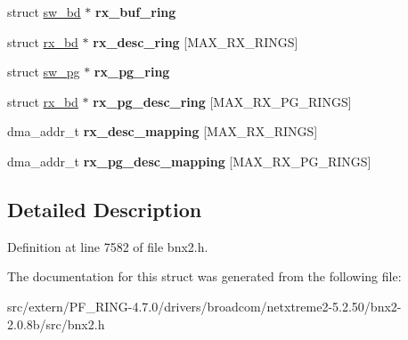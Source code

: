 \begin{DoxyCompactItemize}
\item 
\hypertarget{structbnx2__rx__ring__info_a7eef8a327b14adf7371ff3d52bf37116}{
struct \hyperlink{structsw__bd}{sw\_\-bd} $\ast$ {\bfseries rx\_\-buf\_\-ring}}
\label{structbnx2__rx__ring__info_a7eef8a327b14adf7371ff3d52bf37116}

\item 
\hypertarget{structbnx2__rx__ring__info_a41338d54fb234d07ecdc61f8ce20fc56}{
struct \hyperlink{structrx__bd}{rx\_\-bd} $\ast$ {\bfseries rx\_\-desc\_\-ring} \mbox{[}MAX\_\-RX\_\-RINGS\mbox{]}}
\label{structbnx2__rx__ring__info_a41338d54fb234d07ecdc61f8ce20fc56}

\item 
\hypertarget{structbnx2__rx__ring__info_a7b2e9eb4bd987b8bb52fb674bae6262d}{
struct \hyperlink{structsw__pg}{sw\_\-pg} $\ast$ {\bfseries rx\_\-pg\_\-ring}}
\label{structbnx2__rx__ring__info_a7b2e9eb4bd987b8bb52fb674bae6262d}

\item 
\hypertarget{structbnx2__rx__ring__info_a10c7ebc7021e44112f2642884e8a659f}{
struct \hyperlink{structrx__bd}{rx\_\-bd} $\ast$ {\bfseries rx\_\-pg\_\-desc\_\-ring} \mbox{[}MAX\_\-RX\_\-PG\_\-RINGS\mbox{]}}
\label{structbnx2__rx__ring__info_a10c7ebc7021e44112f2642884e8a659f}

\item 
\hypertarget{structbnx2__rx__ring__info_a7a166e4a8b81f1431d48d49fd57a9d4c}{
dma\_\-addr\_\-t {\bfseries rx\_\-desc\_\-mapping} \mbox{[}MAX\_\-RX\_\-RINGS\mbox{]}}
\label{structbnx2__rx__ring__info_a7a166e4a8b81f1431d48d49fd57a9d4c}

\item 
\hypertarget{structbnx2__rx__ring__info_abfe4905d4a02fd168b3e987799bb0948}{
dma\_\-addr\_\-t {\bfseries rx\_\-pg\_\-desc\_\-mapping} \mbox{[}MAX\_\-RX\_\-PG\_\-RINGS\mbox{]}}
\label{structbnx2__rx__ring__info_abfe4905d4a02fd168b3e987799bb0948}

\end{DoxyCompactItemize}


\subsection{Detailed Description}


Definition at line 7582 of file bnx2.h.



The documentation for this struct was generated from the following file:\begin{DoxyCompactItemize}
\item 
src/extern/PF\_\-RING-\/4.7.0/drivers/broadcom/netxtreme2-\/5.2.50/bnx2-\/2.0.8b/src/bnx2.h\end{DoxyCompactItemize}
